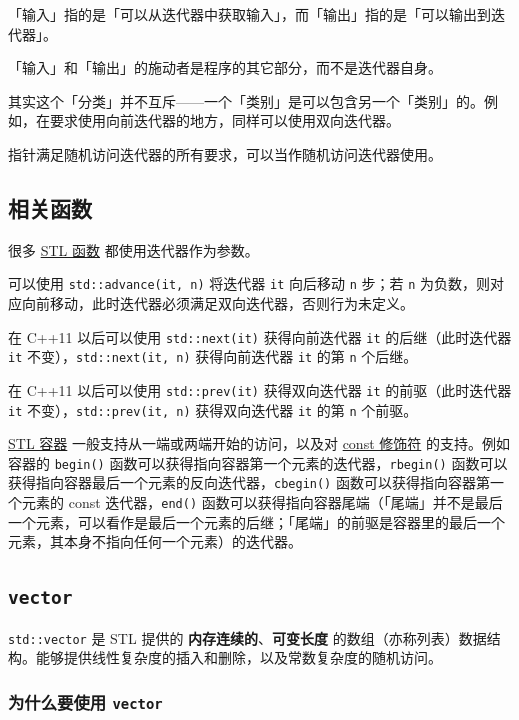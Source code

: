 「输入」指的是「可以从迭代器中获取输入」，而「输出」指的是「可以输出到迭代器」。

「输入」和「输出」的施动者是程序的其它部分，而不是迭代器自身。

其实这个「分类」并不互斥------一个「类别」是可以包含另一个「类别」的。例如，在要求使用向前迭代器的地方，同样可以使用双向迭代器。

指针满足随机访问迭代器的所有要求，可以当作随机访问迭代器使用。

\subsection{相关函数}\label{ux76f8ux5173ux51fdux6570}

很多 \href{./algorithm.md}{STL 函数} 都使用迭代器作为参数。

可以使用 \texttt{std::advance(it,\ n)} 将迭代器 \texttt{it} 向后移动 \texttt{n} 步；若 \texttt{n} 为负数，则对应向前移动，此时迭代器必须满足双向迭代器，否则行为未定义。

在 C++11 以后可以使用 \texttt{std::next(it)} 获得向前迭代器 \texttt{it} 的后继（此时迭代器 \texttt{it} 不变），\texttt{std::next(it,\ n)} 获得向前迭代器 \texttt{it} 的第 \texttt{n} 个后继。

在 C++11 以后可以使用 \texttt{std::prev(it)} 获得双向迭代器 \texttt{it} 的前驱（此时迭代器 \texttt{it} 不变），\texttt{std::prev(it,\ n)} 获得双向迭代器 \texttt{it} 的第 \texttt{n} 个前驱。

\href{./container.md}{STL 容器} 一般支持从一端或两端开始的访问，以及对 \href{../const.md}{const 修饰符} 的支持。例如容器的 \texttt{begin()} 函数可以获得指向容器第一个元素的迭代器，\texttt{rbegin()} 函数可以获得指向容器最后一个元素的反向迭代器，\texttt{cbegin()} 函数可以获得指向容器第一个元素的 const 迭代器，\texttt{end()} 函数可以获得指向容器尾端（「尾端」并不是最后一个元素，可以看作是最后一个元素的后继；「尾端」的前驱是容器里的最后一个元素，其本身不指向任何一个元素）的迭代器。

\subsection{\texorpdfstring{\texttt{vector}}{vector}}\label{vector}

\texttt{std::vector} 是 STL 提供的 \textbf{内存连续的}、\textbf{可变长度} 的数组（亦称列表）数据结构。能够提供线性复杂度的插入和删除，以及常数复杂度的随机访问。

\subsubsection{\texorpdfstring{为什么要使用 \texttt{vector}}{为什么要使用 vector}}\label{ux4e3aux4ec0ux4e48ux8981ux4f7fux7528-vector}


